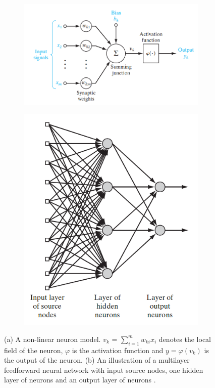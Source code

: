 	\begin{figure}
		\centering
		\begin{subfigure}{.5\textwidth}
			\centering
			\includegraphics[width=1\linewidth]{images/neuron}
			\caption{}
			\label{Fig:haykin_ann_n}
		\end{subfigure}
		\begin{subfigure}{.3\textwidth}
			\centering
			\includegraphics[width=1\linewidth]{images/ml_ff_nn}
			\caption{}
			\label{Fig:haykin_ann_ml}
		\end{subfigure}
		\caption{(a) A non-linear neuron model. $v_k$ = $\sum_{i=1}^{m} w_{ki} x_i$ denotes the local field of the neuron, $\varphi$ is the activation function and $y = \varphi(v_k)$ is the output of the neuron. (b) An illustration of a multilayer feedforward neural network with input source nodes, one hidden layer of neurons and an output layer of neurons \cite{haykin}.}
		\label{Fig:haykin_ann}
	\end{figure}


